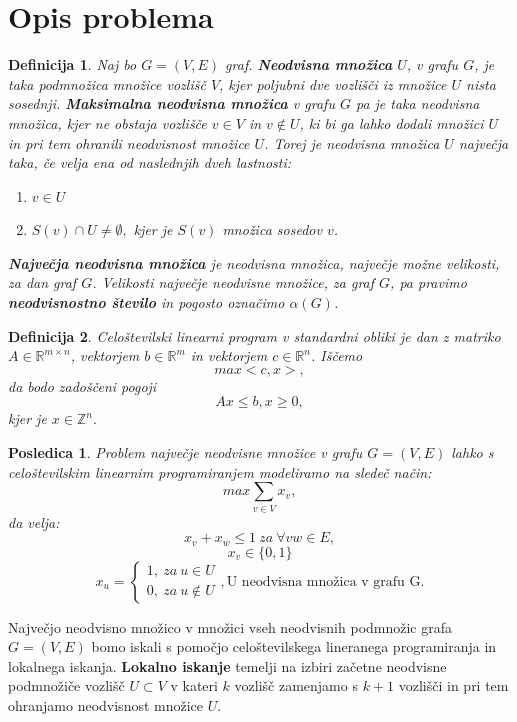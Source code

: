 \documentclass[a4paper, 12pt]{article}
\newtheorem{definicija}{Definicija}
\newtheorem{posledica}{Posledica}
\begin{document}
\section{Opis problema}
\begin{definicija}
    Naj bo $G = (V,E)$ graf. \textbf{Neodvisna množica} $U$, v grafu $G$, je taka podmnožica množice vozlišč $V$, kjer poljubni dve vozlišči iz množice $U$ nista sosednji.
    \textbf{Maksimalna neodvisna množica} v grafu $G$ pa je taka neodvisna množica, kjer ne obstaja vozlišče $v \in V$ in $v \notin U$, ki bi ga lahko dodali množici $U$ in pri tem ohranili neodvisnost množice $U$. Torej
    je neodvisna množica $U$ največja taka, če velja ena od naslednjih dveh lastnosti:
    \begin{enumerate}
        \item $v \in U$
        \item $S(v) \cap U \neq \emptyset,$ kjer je $S(v)$ množica sosedov $v$.
    \end{enumerate}
    \textbf{Največja neodvisna množica} je neodvisna množica, največje možne velikosti, za dan graf $G$. Velikosti največje neodvisne množice, za graf $G$, pa pravimo \textbf{neodvisnostno število} in 
    pogosto označimo $\alpha(G)$.
\end{definicija}

\begin{definicija}
    Celoštevilski linearni program v standardni obliki je dan z matriko $A \in \mathbb{R}^{m \times n}$, vektorjem $b \in \mathbb{R}^{m}$ in vektorjem $c \in \mathbb{R}^{n}$. Iščemo
    $$max<c,x>,$$
    da bodo zadoščeni pogoji
    $$ Ax \leq b, x \geq 0,$$
    kjer je $x \in \mathbb{Z}^{n}.$

\end{definicija}

\begin{posledica}
Problem največje neodvisne množice v grafu $G=(V,E)$ lahko s celoštevilskim linearnim programiranjem modeliramo na sledeč način:
$$max \sum_{v \in V} x_{v},$$
da velja:
$$ x_{v} + x_{w} \leq 1 \ za \ \forall vw \in E,$$
$$ x_{v} \in \{0, 1 \}$$
$$ x_{u} = 
    \begin{cases}
    1, \ za \ u \in U \\
    0, \ za \ u \notin U
    \end{cases}, \text{U neodvisna množica v grafu G.}
$$
\end{posledica}

\noindent Največjo neodvisno množico v množici vseh neodvisnih podmnožic grafa $G = (V,E)$ bomo iskali s pomočjo celoštevilskega lineranega programiranja in lokalnega iskanja. \textbf{Lokalno iskanje} temelji na
izbiri začetne neodvisne podmnožiče vozlišč $U \subset V$ v kateri $k$ vozlišč zamenjamo s $k + 1$ vozlišči in pri tem ohranjamo neodvisnost množice $U$.
\end{document}
